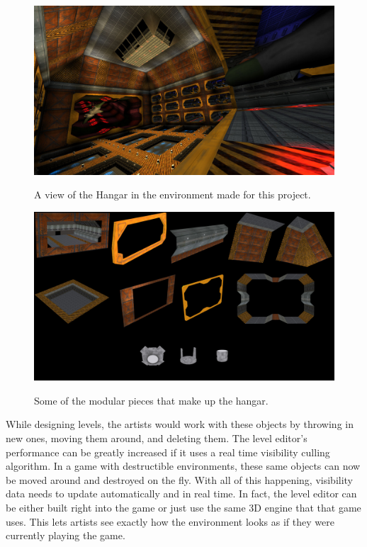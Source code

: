 \documentclass[12pt]{ucthesis}
\newcommand{\captionfonts}{\small\bf\ssp}
\begin{document}
\begin{figure}
\begin{center}
\includegraphics[width=\textwidth]{Images/Hangar.jpg}
\captionfonts
\caption[Hangar]{A view of the Hangar in the environment made for this project.}
\label{fig:hangar-view}
\includegraphics[width=\textwidth]{Images/Peices.jpg}
\captionfonts
\caption[Hangar Modular Pieces]{Some of the modular pieces that make up the hangar.}
\label{fig:hangar-peices}
\end{center}
\end{figure}

While designing levels, the artists would work with these objects by throwing in new ones, moving them around, and deleting them.
The level editor's performance can be greatly increased if it uses a real time visibility culling  algorithm.
In a game with destructible environments, these same objects can now be moved around and destroyed on the fly.
With all of this happening, visibility data needs to update automatically and in real time.
In fact, the level editor can be either built right into the game or just use the same 3D engine that that game uses.
This lets artists see exactly how the environment looks as if they were currently playing the game.
\end{document}
